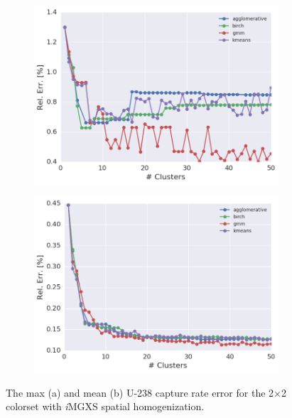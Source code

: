 \begin{figure}[h!]
\centering
\begin{subfigure}{0.9\textwidth}
  \centering
  \includegraphics[width=\linewidth]{figures/results/err-by-cluster/2x2/max-rel-err}
  \caption{}
  \label{fig:chap11-max-capt-err-by-cluster-2x2}
\end{subfigure}
\begin{subfigure}{0.9\textwidth}
  \centering
  \includegraphics[width=\linewidth]{figures/results/err-by-cluster/2x2/mean-rel-err}
  \caption{}
  \label{fig:chap11-mean-capt-err-by-cluster-2x2}
\end{subfigure}
\caption[U-238 capture error for the 2$\times$2 colorset]{The max (a) and mean (b) U-238 capture rate error for the 2$\times$2 colorset with \textit{i}\ac{MGXS} spatial homogenization.}
\label{fig:chap11-capt-err-by-cluster-2x2}
\end{figure}

